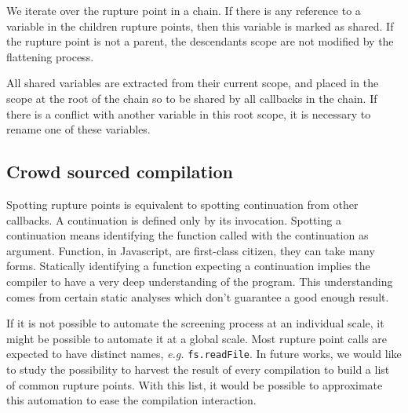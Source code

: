 We iterate over the rupture point in a chain.
If there is any reference to a variable in the children rupture points, then this variable is marked as shared.
If the rupture point is not a parent, the descendants scope are not modified by the flattening process.

All shared variables are extracted from their current scope, and placed in the scope at the root of the chain so to be shared by all callbacks in the chain.
If there is a conflict with another variable in this root scope, it is necessary to rename one of these variables.



\subsection{Crowd sourced compilation} \label{section:compiler:lib-compilation}

Spotting rupture points is equivalent to spotting continuation from other callbacks.
A continuation is defined only by its invocation.
Spotting a continuation means identifying the function called with the continuation as argument.
Function, in Javascript, are first-class citizen, they can take many forms.
Statically identifying a function expecting a continuation implies the compiler to have a very deep understanding of the program.
This understanding comes from certain static analyses which don't guarantee a good enough result.

If it is not possible to automate the screening process at an individual scale, it might be possible to automate it at a global scale.
Most rupture point calls are expected to have distinct names, \textit{e.g.} \texttt{fs.readFile}.
In future works, we would like to study the possibility to harvest the result of every compilation to build a list of common rupture points.
With this list, it would be possible to approximate this automation to ease the compilation interaction.


